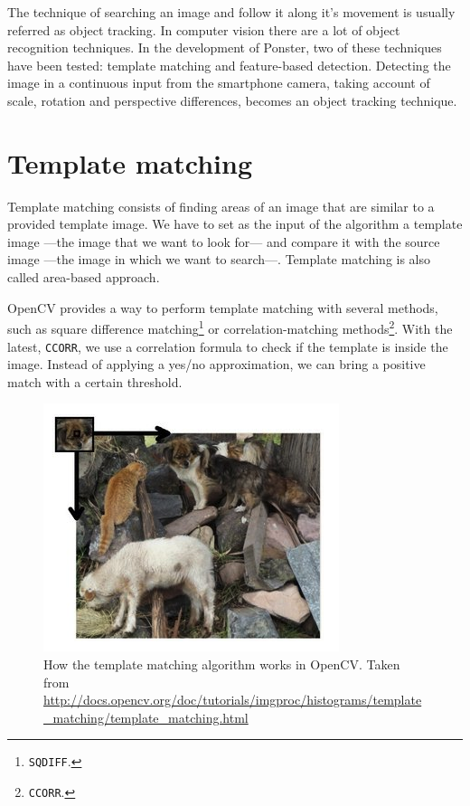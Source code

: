 The technique of searching an image and follow it along it's 
movement is usually referred as object tracking. 
In computer vision there are a lot of object recognition techniques. In the
development of Ponster, two of these techniques have been tested: template
matching and feature-based detection. Detecting the image in a continuous input from
the smartphone camera, taking account of scale, rotation and perspective
differences, becomes an object tracking technique. 

\section{Template matching}
Template matching\cite{ocv01} consists of finding areas of an image that are similar to a
provided template image. We have to set as the input of the algorithm a template
image ---the image that we want to look for--- and compare it with the source image
---the image in which we want to search\cite{tmatch01}---. Template matching is also
called area-based approach. 

OpenCV provides a way to perform template matching with several methods, such as
square difference matching\footnote{\texttt{SQDIFF}.} or correlation-matching
methods\footnote{\texttt{CCORR}.}. With the latest, \texttt{CCORR}, we use a 
correlation formula to check if the template is inside the image. Instead of
applying a yes/no approximation, we can bring a positive match with a certain
threshold. 

\begin{figure}
\centering
\includegraphics[scale=0.55]{img/templatematch.png}
\caption{\label{fig:templatematch}How the template matching algorithm works in
  OpenCV. Taken from
  \url{http://docs.opencv.org/doc/tutorials/imgproc/histograms/template_matching/template_matching.html}} 
\end{figure} 

